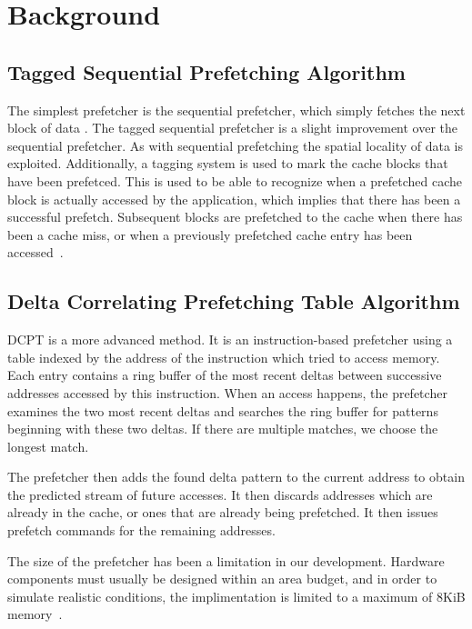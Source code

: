 \section{Background}

\subsection{Tagged Sequential Prefetching Algorithm}

The simplest prefetcher is the sequential prefetcher, which simply fetches the
next block of data \citep{seq}. The tagged sequential prefetcher is a slight
improvement over the sequential prefetcher. As with sequential prefetching the
spatial locality of data is exploited. Additionally, a tagging system is used to
mark the cache blocks that have been prefetced. This is used to be able to
recognize when a prefetched cache block is actually accessed by the application,
which implies that there has been a successful prefetch. Subsequent blocks are
prefetched to the cache when there has been a cache miss, or when a previously
prefetched cache entry has been accessed~\cite{grannaes}.

\subsection{Delta Correlating Prefetching Table Algorithm}

DCPT is a more advanced method. It is an instruction-based prefetcher using a
table indexed by the address of the instruction which tried to access memory.
Each entry contains a ring buffer of the most recent deltas between successive
addresses accessed by this instruction. When an access happens, the prefetcher
examines the two most recent deltas and searches the ring buffer for patterns
beginning with these two deltas. If there are multiple matches, we choose the
longest match.

The prefetcher then adds the found delta pattern to the current address to
obtain the predicted stream of future accesses. It then discards addresses which
are already in the cache, or ones that are already being prefetched. It then
issues prefetch commands for the remaining addresses.


The size of the prefetcher has been a limitation in our development. Hardware
components must usually be designed within an area budget, and in order to
simulate realistic conditions, the implimentation is limited to a maximum of
8KiB memory~\cite{guidelines}.

